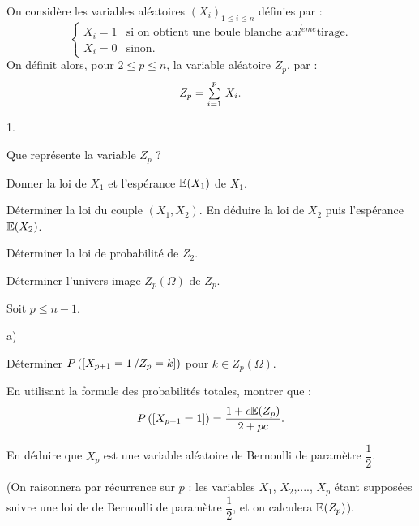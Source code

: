 \documentclass[11pt]{article}%
\begin{document}
On considère les variables aléatoires $\left( X_{i}\right)_{1\leq
i\leq n}$ définies par : 
\[
\left\{
\begin{array}{cl}
X_{i} = 1 & \text{si on obtient une boule blanche au
}i^{\grave{e}me}\text{
tirage.} \\
X_{i} = 0 & \text{sinon.}
\end{array}
\right.
\]
On définit alors, pour $2\leq p\leq n$, la variable aléatoire $Z_{p}$,
par : 
\[
Z_{p} = {\textstyle\sum\limits_{i = 1}^{p}}\hspace{.1cm}X_{i}.
\]

\begin{noliste}{1.}
 \setlength{\itemsep}{4mm}
\item Que représente la variable $Z_{p}$ ?

\item Donner la loi de $X_{1}$ et l'espérance $\mathbb{E}(X_{1})$ de $X_{1}$.

\item Déterminer la loi du couple $(X_{1},X_{2})$. En déduire la loi de
$X_{2}$ puis l'espérance $\mathbb{E}(X_{2})$.

\item Déterminer la loi de probabilité de $Z_{2}$.

\item Déterminer l'univers image $Z_{p}\left( \Omega \right) $ de
$Z_{p}$.

\item Soit $p\leq n-1$.

\begin{noliste}{a)}
 \setlength{\itemsep}{2mm}
\item Déterminer $P\left(\left[ {X_{p + 1} = 1\,/Z_{p} = k} \right]\right)$ pour
$k\in Z_{p}\left( \Omega
\right) $.

\item En utilisant la formule des probabilités totales, montrer que : 
\[
P\left(\left[ {X_{p + 1} = 1} \right]\right) = \dfrac{1 + c\mathbb{E}(Z_{p})}{2 + pc}.
\]

\item En déduire que $X_{p}$ est une variable aléatoire de Bernoulli de
paramètre $\dfrac{1}{2}$.

(On raisonnera par récurrence sur $p$ : les variables $X_{1}$,
$X_{2}$,...., $X_{p}$ étant supposées suivre une loi de de Bernoulli de
paramètre $\dfrac{1}{2}$, et on calculera $\mathbb{E}(Z_{p})$).
\end{noliste}
\end{noliste}

\label{fin}
\end{document}
